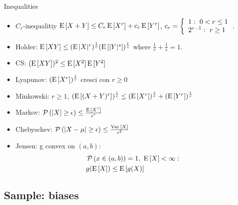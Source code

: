 \documentclass[asd-beamer.tex]{subfiles}%
\begin{document}
\begin{frame}{Inequalities}
    \begin{itemize}
        \item $C_r$-inequalitiy $\operatorname{E}{[X+Y]}\leq C_r\operatorname{E}{[X^r]}+c_r\operatorname{E}{[Y^r]}$, $c_r=\lbt{1:\ 0<r\leq1}{2^{r-1}:\ r\geq1}$.
        \item Holder: $\operatorname{E}{[XY]}\leq(\operatorname{E}{|X|^r})^{\frac{1}{r}}(\operatorname{E}{[|Y|^s]})^{\frac{1}{s}}$ where $\frac{1}{r}+\frac{1}{s}=1$.
        \item CS: $(\operatorname{E}{[XY]})^2\leq\operatorname{E}{[X^2]}\operatorname{E}{[Y^2]}$
        \item Lyapunov: $(\operatorname{E}{[X^r]})^{\frac{1}{r}}$ cresci con $r\geq0$
        \item Minkowski: $r\geq1$, $(\operatorname{E}{[(X+Y)^r]})^{\frac{1}{r}}\leq(\operatorname{E}{[X^r]})^{\frac{1}{r}}+(\operatorname{E}{[Y^r]})^{\frac{1}{r}}$
        \item Markov: $\operatorname{\mathcal{P}}{(|X|\geq\epsilon)}\leq\frac{\operatorname{E}{[X^r]}}{\epsilon^r}$
        \item Chebyschev: $\operatorname{\mathcal{P}}{(|X-\mu|\geq\epsilon)}\leq \frac{\operatorname{Var}{[X]}}{\epsilon^2}$
        \item Jensen: g convex on $(a,b)$:
            \begin{align*}
                &\operatorname{\mathcal{P}}{(x\in(a,b))}=1,\ \operatorname{E}{[X]}<\infty:\\
                &g(\operatorname{E}{[X]})\leq\operatorname{E}{[g(X)]}
            \end{align*}
    \end{itemize}
\end{frame}
\subsection{Sample: biases}
\end{document}
